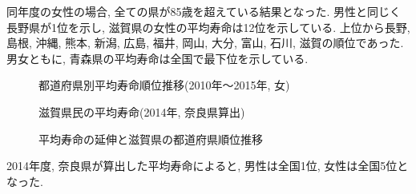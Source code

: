 
同年度の女性の場合, 全ての県が85歳を超えている結果となった.
男性と同じく長野県が1位を示し, 滋賀県の女性の平均寿命は12位を示している.
上位から長野, 島根, 沖縄, 熊本, 新潟, 広島, 福井, 岡山, 大分, 富山, 石川, 滋賀の順位であった.
男女ともに, 青森県の平均寿命は全国で最下位を示している.
\begin{figure}[h!]
	\begin{center}
		\caption{都道府県別平均寿命順位推移(2010年〜2015年, 女)}\end{center}
\end{figure}


%
\begin{figure}[h!]
	\begin{center}
		\caption{滋賀県民の平均寿命(2014年, 奈良県算出)}\label{fig1}
	\end{center}
\end{figure}



\begin{figure}[h!]
	\begin{center}
		\caption{平均寿命の延伸と滋賀県の都道府県順位推移}
	\end{center}
\end{figure}
%
2014年度, 奈良県が算出した平均寿命によると, 男性は全国1位, 女性は全国5位となった.

